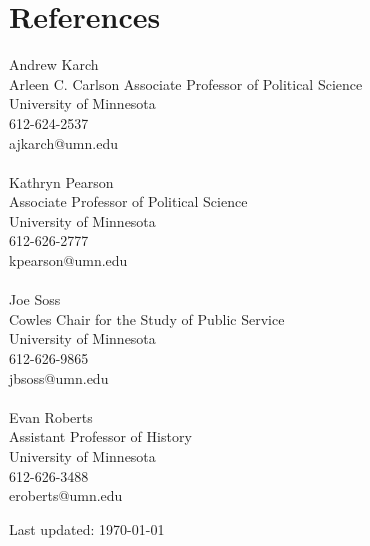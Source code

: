 \documentclass[12pt, letter]{article}
\begin{document}
\section*{References}
	Andrew Karch \\
	Arleen C. Carlson Associate Professor of Political Science \\
	University of Minnesota \\
	612-624-2537 \\
	ajkarch@umn.edu \\
	\\
	Kathryn Pearson \\
	Associate Professor of Political Science \\
	University of Minnesota \\
	612-626-2777 \\
	kpearson@umn.edu\\
	\\
	Joe Soss \\
	Cowles Chair for the Study of Public Service \\
	University of Minnesota \\
	612-626-9865 \\
	jbsoss@umn.edu \\
	\\
	Evan Roberts \\
	Assistant Professor of History \\
	University of Minnesota \\
	612-626-3488 \\
	eroberts@umn.edu
\begin{center}
\scriptsize{Last updated: \today}

\end{center}
\end{document}
